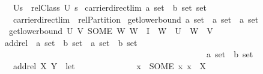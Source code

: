 \documentclass[12pt]{scrartcl}
\begin{document}
\begin{isabelle}
\ \ \ {\isachardoublequoteopen}{\isasymlfloor}U{\isacharcomma}{\kern0pt}s{\isasymrfloor}\ {\isasymequiv}\ rel{\isachardot}{\kern0pt}Class\ {\isacharparenleft}{\kern0pt}U{\isacharcomma}{\kern0pt}\ s{\isacharparenright}{\kern0pt}{\isachardoublequoteclose}\isanewline
\isanewline
{}\isamarkupfalse%
\ carrier{\isacharunderscore}{\kern0pt}direct{\isacharunderscore}{\kern0pt}lim{\isacharcolon}{\kern0pt}{\isacharcolon}{\kern0pt}\ {\isachardoublequoteopen}{\isacharparenleft}{\kern0pt}{\isacharprime}{\kern0pt}a\ set\ {\isasymtimes}\ {\isacharprime}{\kern0pt}b{\isacharparenright}{\kern0pt}\ set\ set{\isachardoublequoteclose}\isanewline
\ \ \ {\isachardoublequoteopen}carrier{\isacharunderscore}{\kern0pt}direct{\isacharunderscore}{\kern0pt}lim\ {\isasymequiv}\ rel{\isachardot}{\kern0pt}Partition{\isachardoublequoteclose}\isanewline
\isanewline
{}\isamarkupfalse%
\ get{\isacharunderscore}{\kern0pt}lower{\isacharunderscore}{\kern0pt}bound{\isacharcolon}{\kern0pt}{\isacharcolon}{\kern0pt}\ {\isachardoublequoteopen}{\isacharprime}{\kern0pt}a\ set\ {\isasymRightarrow}\ {\isacharprime}{\kern0pt}a\ set\ {\isasymRightarrow}\ {\isacharprime}{\kern0pt}a\ set{\isachardoublequoteclose}\ \isanewline
\ \ {\isachardoublequoteopen}get{\isacharunderscore}{\kern0pt}lower{\isacharunderscore}{\kern0pt}bound\ U\ V{\isacharequal}{\kern0pt}\ {\isacharparenleft}{\kern0pt}SOME\ W{\isachardot}{\kern0pt}\ W\ {\isasymin}\ I\ {\isasymand}\ W\ {\isasymsubseteq}\ U\ {\isasymand}\ W\ {\isasymsubseteq}\ V{\isacharparenright}{\kern0pt}{\isachardoublequoteclose}\isanewline
\isanewline
{}\isamarkupfalse%
\ add{\isacharunderscore}{\kern0pt}rel\ {\isacharcolon}{\kern0pt}{\isacharcolon}{\kern0pt}\ {\isachardoublequoteopen}{\isacharparenleft}{\kern0pt}{\isacharprime}{\kern0pt}a\ set\ {\isasymtimes}\ {\isacharprime}{\kern0pt}b{\isacharparenright}{\kern0pt}\ set\ {\isasymRightarrow}\ {\isacharparenleft}{\kern0pt}{\isacharprime}{\kern0pt}a\ set\ {\isasymtimes}\ {\isacharprime}{\kern0pt}b{\isacharparenright}{\kern0pt}\ set\ \isanewline
\ \ \ \ \ \ \ \ \ \ \ \ \ \ \ \ \ \ \ \ \ \ \ \ \ \ \ \ \ \ \ \ \ \ \ \ \ \ \ \ \ \ \ \ \ \ \ \ {\isasymRightarrow}\ {\isacharparenleft}{\kern0pt}{\isacharprime}{\kern0pt}a\ set\ {\isasymtimes}\ {\isacharprime}{\kern0pt}b{\isacharparenright}{\kern0pt}\ set{\isachardoublequoteclose}\isanewline
\ \ \ {\isachardoublequoteopen}add{\isacharunderscore}{\kern0pt}rel\ X\ Y\ {\isasymequiv}\ let\isanewline
\ \ \ \ \ \ \ \ \ \ \ \ \ \ x\ {\isacharequal}{\kern0pt}\ {\isacharparenleft}{\kern0pt}SOME\ x{\isachardot}{\kern0pt}\ x\ {\isasymin}\ X{\isacharparenright}{\kern0pt}{\isacharsemicolon}{\kern0pt}\isanewline

\end{isabelle}
\end{document}
